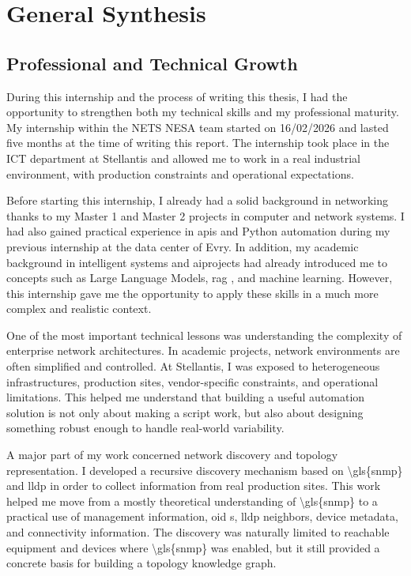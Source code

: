 \documentclass[11pt,a4paper]{report}
\begin{document}

\chapter*{General Synthesis}

\section*{Professional and Technical Growth}

During this internship and the process of writing this thesis, I had the opportunity to strengthen both my technical skills and my professional maturity. My internship within the NETS NESA team started on 16/02/2026 and lasted five months at the time of writing this report. The internship took place in the ICT department at Stellantis and allowed me to work in a real industrial environment, with production constraints and operational expectations.

Before starting this internship, I already had a solid background in networking thanks to my Master 1 and Master 2 projects in computer and network systems. I had also gained practical experience in \gls{api}s and Python automation during my previous internship at the data center of Evry. In addition, my academic background in intelligent systems and \gls{ai}projects had already introduced me to concepts such as Large Language Models,  \gls{rag} , and machine learning. However, this internship gave me the opportunity to apply these skills in a much more complex and realistic context.

One of the most important technical lessons was understanding the complexity of enterprise network architectures. In academic projects, network environments are often simplified and controlled. At Stellantis, I was exposed to heterogeneous infrastructures, production sites, vendor-specific constraints, and operational limitations. This helped me understand that building a useful automation solution is not only about making a script work, but also about designing something robust enough to handle real-world variability.

A major part of my work concerned network discovery and topology representation. I developed a recursive discovery mechanism based on \gls{\gls{snmp}} and \gls{lldp}  in order to collect information from real production sites. This work helped me move from a mostly theoretical understanding of \gls{\gls{snmp}} to a practical use of management information,  \gls{oid} s, \gls{lldp}  neighbors, device metadata, and connectivity information. The discovery was naturally limited to reachable equipment and devices where \gls{\gls{snmp}} was enabled, but it still provided a concrete basis for building a topology knowledge graph.
\end{document}
